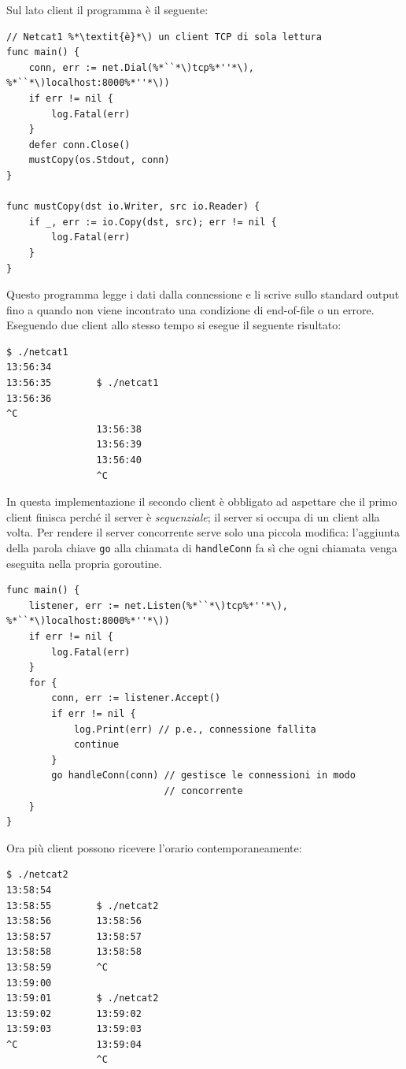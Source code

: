 Sul lato client il programma è il seguente:
\begin{lstlisting}[frame=single, label={lst:lstlisting7-2.2}]
// Netcat1 %*\textit{è}*\) un client TCP di sola lettura
func main() {
    conn, err := net.Dial(%*``*\)tcp%*''*\), %*``*\)localhost:8000%*''*\))
    if err != nil {
        log.Fatal(err)
    }
    defer conn.Close()
    mustCopy(os.Stdout, conn)
}

func mustCopy(dst io.Writer, src io.Reader) {
    if _, err := io.Copy(dst, src); err != nil {
        log.Fatal(err)
    }
}
\end{lstlisting}
Questo programma legge i dati dalla connessione e li scrive sullo standard output fino a quando non viene incontrato una condizione di end-of-file o un errore.
Eseguendo due client allo stesso tempo si esegue il seguente risultato:
\begin{lstlisting}[language=bash, frame=L, label={lst:lstlisting7-2.3}]
$ ./netcat1
13:56:34
13:56:35        $ ./netcat1
13:56:36
^C
                13:56:38
                13:56:39
                13:56:40
                ^C
\end{lstlisting}
In questa implementazione il secondo client è obbligato ad aspettare che il primo client finisca perché il server è \textit{sequenziale};
il server si occupa di un client alla volta.
Per rendere il server concorrente serve solo una piccola modifica: l'aggiunta della parola chiave \verb|go| alla chiamata di \verb|handleConn| fa sì che ogni chiamata venga eseguita nella propria goroutine.
\begin{lstlisting}[frame=single, label={lst:lstlisting7-2.4}]
func main() {
    listener, err := net.Listen(%*``*\)tcp%*''*\), %*``*\)localhost:8000%*''*\))
    if err != nil {
        log.Fatal(err)
    }
    for {
        conn, err := listener.Accept()
        if err != nil {
            log.Print(err) // p.e., connessione fallita
            continue
        }
        go handleConn(conn) // gestisce le connessioni in modo
                            // concorrente
    }
}
\end{lstlisting}
Ora più client possono ricevere l'orario contemporaneamente:
\begin{lstlisting}[language=bash, frame=L, label={lst:lstlisting7-2.5}]
$ ./netcat2
13:58:54
13:58:55        $ ./netcat2
13:58:56        13:58:56
13:58:57        13:58:57
13:58:58        13:58:58
13:58:59        ^C
13:59:00
13:59:01        $ ./netcat2
13:59:02        13:59:02
13:59:03        13:59:03
^C              13:59:04
                ^C
\end{lstlisting}



